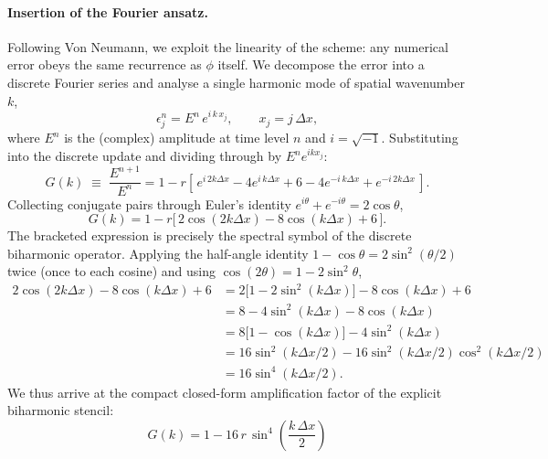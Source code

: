 \paragraph{Insertion of the Fourier ansatz.} Following Von Neumann, we exploit the linearity of the scheme: any numerical error obeys the same recurrence as $\phi$ itself.
We decompose the error into a discrete Fourier series and analyse a single harmonic mode of spatial wavenumber $k$,
\begin{equation}
    \epsilon_j^n = E^n\,e^{i\,k\,x_j}, \qquad x_j = j\,\Delta x,
\end{equation}
where $E^n$ is the (complex) amplitude at time level $n$ and $i = \sqrt{-1}$.
Substituting into the discrete update and dividing through by $E^n e^{ikx_j}$:
\begin{equation}
    G(k) \;\equiv\; \frac{E^{n+1}}{E^n} = 1 - r\left[\, e^{i\,2k\Delta x} - 4 e^{i\,k\Delta x} + 6 - 4 e^{-i\,k\Delta x} + e^{-i\,2k\Delta x}\,\right].
\end{equation}
Collecting conjugate pairs through Euler's identity $e^{i\theta} + e^{-i\theta} = 2\cos\theta$,
\begin{equation}
    G(k) = 1 - r\bigl[\,2\cos(2k\Delta x) - 8\cos(k\Delta x) + 6\,\bigr].
\end{equation}
The bracketed expression is precisely the spectral symbol of the discrete biharmonic operator.
Applying the half-angle identity $1 - \cos\theta = 2\sin^2(\theta/2)$ twice (once to each cosine) and using $\cos(2\theta) = 1 - 2\sin^2\theta$,
\begin{align}
    2\cos(2k\Delta x) - 8\cos(k\Delta x) + 6
    &= 2\bigl[1 - 2\sin^2(k\Delta x)\bigr] - 8\cos(k\Delta x) + 6 \nonumber \\
    &= 8 - 4\sin^2(k\Delta x) - 8\cos(k\Delta x) \nonumber \\
    &= 8\bigl[1 - \cos(k\Delta x)\bigr] - 4\sin^2(k\Delta x) \nonumber \\
    &= 16\sin^2(k\Delta x/2) - 16\sin^2(k\Delta x/2)\cos^2(k\Delta x/2) \nonumber \\
    &= 16\sin^4(k\Delta x/2).
\end{align}
We thus arrive at the compact closed-form amplification factor of the explicit biharmonic stencil:
\begin{equation}
    \boxed{\;G(k) = 1 - 16\,r\,\sin^4\!\!\left(\frac{k\,\Delta x}{2}\right)\;}
\end{equation}

